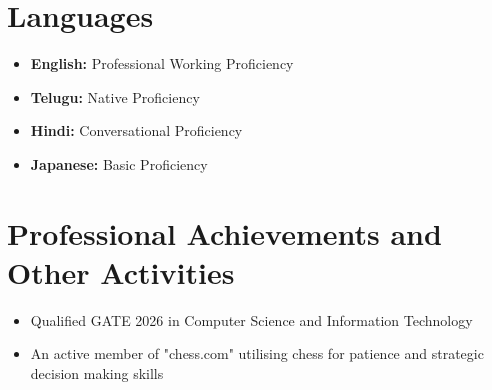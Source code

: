 \documentclass[a4paper,11pt]{article}
\begin{document}
\section*{\textbf{Languages}}
\begin{itemize}[leftmargin=*]
    \item \textbf{English:} Professional Working Proficiency
    \item \textbf{Telugu:} Native Proficiency
    \item \textbf{Hindi:} Conversational Proficiency
    \item \textbf{Japanese:} Basic Proficiency
\end{itemize}


\section*{\textbf{Professional Achievements and Other Activities}}
\begin{itemize}[leftmargin=*]
    \item Qualified GATE 2026 in Computer Science and Information Technology
    \item An active member of "chess.com" utilising chess for patience and strategic decision making skills
\end{itemize}
\end{document}
